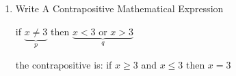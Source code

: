 \documentclass[10pt,letterpaper]{article}
\begin{document}
{\begin{enumerate}
    * notice they are not logically equivalent
    
    \hrulefill
    \item[] Write A Contrapositive Mathematical Expression
    
    if $\underbrace{x \not= 3}_{p}$ then $ \underbrace{x < 3 \text{ or } x > 3}_{q} $
    
    the contrapositive is:
    \quad if $x \geq 3 $ and $ x \leq 3$ then $x = 3$ \checkmark
    

\end{enumerate}
}
\end{document}
